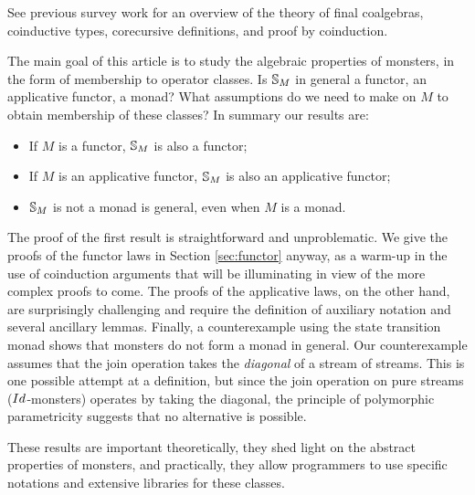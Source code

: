 See previous survey work \cite{capretta:2011} for an overview of the theory of final coalgebras, coinductive types, corecursive definitions, and proof by coinduction.

The main goal of this article is to study the algebraic properties of monsters, in the form of membership to operator classes.
Is $\mathbb{S}_{M}$ in general a functor, an applicative functor, a monad?
What assumptions do we need to make on $M$ to obtain membership of these classes?
In summary our results are:
\begin{itemize}
\item If $M$ is a functor, $\mathbb{S}_{M}$ is also a functor;
\item If $M$ is an applicative functor, $\mathbb{S}_{M}$ is also an applicative functor;
\item $\mathbb{S}_{M}$ is not a monad is general, even when $M$ is a monad.
\end{itemize}

The proof of the first result is straightforward and unproblematic.
We give the proofs of the functor laws in Section \ref{sec:functor} anyway, as a warm-up in the use of coinduction arguments that will be illuminating in view of the more complex proofs to come.
The proofs of the applicative laws, on the other hand, are surprisingly challenging and require the definition of auxiliary notation and several ancillary lemmas.
Finally, a counterexample using the state transition monad shows that monsters do not form a monad in general. Our counterexample assumes that the join operation takes the {\em diagonal} of a stream of streams.
This is one possible attempt at a definition, but since the join operation on pure streams ($\Id$-monsters) operates by taking the diagonal, the principle of polymorphic parametricity suggests that no alternative is possible.

These results are important theoretically, they shed light on the abstract properties of monsters, and practically, they allow programmers to use specific notations and extensive libraries for these classes.
